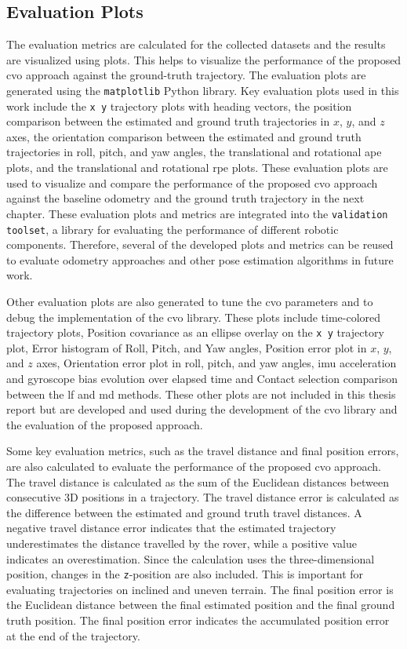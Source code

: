 \documentclass[report.tex]{subfiles}
\begin{document}
    \subsection{Evaluation Plots}
    
    The evaluation metrics are calculated for the collected datasets and the results are visualized using plots. This helps to visualize the performance of the proposed \gls{cvo} approach against the ground-truth trajectory. The evaluation plots are generated using the \texttt{matplotlib} Python library. Key evaluation plots used in this work include the \texttt{x y} trajectory plots with heading vectors, the position comparison between the estimated and ground truth trajectories in $x$, $y$, and $z$ axes, the orientation comparison between the estimated and ground truth trajectories in roll, pitch, and yaw angles, the translational and rotational \gls{ape} plots, and the translational and rotational \gls{rpe} plots. These evaluation plots are used to visualize and compare the performance of the proposed \gls{cvo} approach against the baseline odometry and the ground truth trajectory in the next chapter. These evaluation plots and metrics are integrated into the \texttt{validation toolset}, a library for evaluating the performance of different robotic components. Therefore, several of the developed plots and metrics can be reused to evaluate odometry approaches and other pose estimation algorithms in future work.  
        
    Other evaluation plots are also generated to tune the \gls{cvo} parameters and to debug the implementation of the \gls{cvo} library. These plots include time-colored trajectory plots, Position covariance as an ellipse overlay on the \texttt{x y} trajectory plot, Error histogram of Roll, Pitch, and Yaw angles, Position error plot in $x$, $y$, and $z$ axes, Orientation error plot in roll, pitch, and yaw angles, \gls{imu} acceleration and gyroscope bias evolution over elapsed time and Contact selection comparison between the \gls{lf} and \gls{md} methods. These other plots are not included in this thesis report but are developed and used during the development of the \gls{cvo} library and the evaluation of the proposed approach. 
    
    Some key evaluation metrics, such as the travel distance and final position errors, are also calculated to evaluate the performance of the proposed \gls{cvo} approach. The travel distance is calculated as the sum of the Euclidean distances between consecutive 3D positions in a trajectory. The travel distance error is calculated as the difference between the estimated and ground truth travel distances. A negative travel distance error indicates that the estimated trajectory underestimates the distance travelled by the rover, while a positive value indicates an overestimation. Since the calculation uses the three-dimensional position, changes in the \texttt{z}-position are also included. This is important for evaluating trajectories on inclined and uneven terrain. The final position error is the Euclidean distance between the final estimated position and the final ground truth position. The final position error indicates the accumulated position error at the end of the trajectory. 
    
\end{document}

